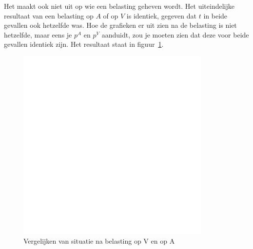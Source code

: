 Het maakt ook niet uit op wie een belasting geheven wordt. Het uiteindelijke resultaat van een belasting op $A$ of op $V$ is identiek, gegeven dat $t$ in beide gevallen ook hetzelfde was. Hoe de grafieken er uit zien na de belasting is niet hetzelfde, maar eens je $p^A$ en $p^V$ aanduidt, zou je moeten zien dat deze voor beide gevallen identiek zijn. Het resultaat staat in figuur~\ref{fig:vergelijkBelasting}.

\begin{figure}[htbp]
	\centering
	\includegraphics[scale=0.4]{Images/white.png}
	\caption{Vergelijken van situatie na belasting op V en op A}
	\label{fig:vergelijkBelasting}
\end{figure}


